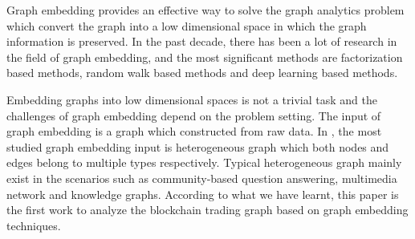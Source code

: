 Graph embedding provides an effective way to solve the graph analytics problem which convert the graph into a low dimensional space in which the graph information is preserved. In the past decade, there has been a lot of research in the field of graph embedding, and the most significant methods are factorization based methods\cite{ahmed2013distributed}\cite{belkin2002laplacian}\cite{roweis2000nonlinear}, random walk based methods\cite{perozzi2014deepwalk}\cite{grover2016node2vec} and deep learning based methods\cite{wang2016structural}\cite{kipf2016semi}. 

Embedding graphs into low dimensional spaces is not a trivial task and the challenges of graph embedding depend on the problem setting. The input of graph embedding is a graph which constructed from raw data. In \cite{goyal2018graph}, the most studied graph embedding input is heterogeneous graph which both nodes and edges belong to multiple types respectively. Typical heterogeneous graph mainly exist in the scenarios such as community-based question answering, multimedia network and knowledge graphs. According to what we have learnt, this paper is the first work to analyze the blockchain trading graph based on graph embedding techniques.